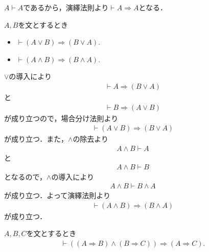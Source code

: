 	\begin{prf}
		$A \vdash A$であるから，演繹法則より$\vdash A \Longrightarrow A$となる．
		\QED
	\end{prf}
	
	\begin{screen}
		\begin{logicalthm}
		\label{logicalthm:commutative_law_of_disjunction_and_conjunction}
			$A,B$を文とするとき
			\begin{itemize}
				\item $\vdash (A \vee B) \Longrightarrow (B \vee A)$.
				\item $\vdash (A \wedge B) \Longrightarrow (B \wedge A)$.
			\end{itemize}
		\end{logicalthm}
	\end{screen}
	
	\begin{prf}
		$\vee$の導入により
		\begin{align}
			\vdash A \Longrightarrow (B \vee A)
		\end{align}
		と
		\begin{align}
			\vdash B \Longrightarrow (A \vee B)
		\end{align}
		が成り立つので，場合分け法則より
		\begin{align}
			\vdash (A \vee B) \Longrightarrow (B \vee A)
		\end{align}
		が成り立つ．また，$\wedge$の除去より
		\begin{align}
			A \wedge B \vdash A
		\end{align}
		と
		\begin{align}
			A \wedge B \vdash B
		\end{align}
		となるので，$\wedge$の導入により
		\begin{align}
			A \wedge B \vdash B \wedge A
		\end{align}
		が成り立つ．よって演繹法則より
		\begin{align}
			\vdash (A \wedge B) \Longrightarrow (B \wedge A)
		\end{align}
		が成り立つ．
		\QED
	\end{prf}
	
	\begin{screen}
		\begin{logicalthm}[含意の推移律]\label{logicalthm:transitive_law_of_implication}
			$A,B,C$を文とするとき
			\begin{align}
				\vdash ((A \Longrightarrow B) \wedge (B \Longrightarrow C)) 
				\Longrightarrow (A \Longrightarrow C).
			\end{align}
		\end{logicalthm}
	\end{screen}
	
